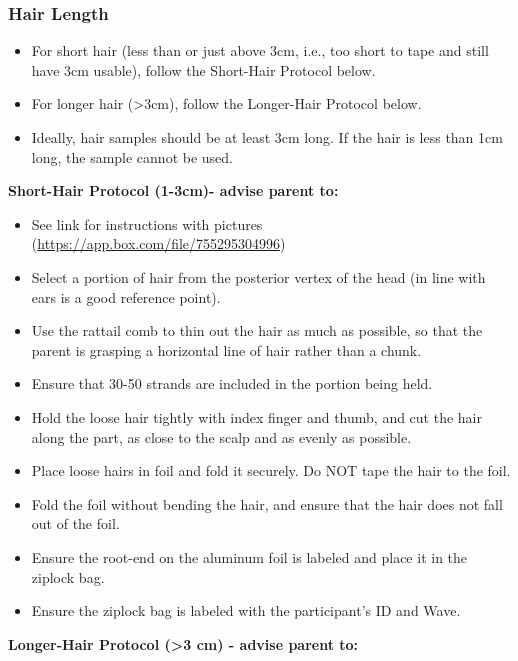 \documentclass[]{book}
\providecommand{\tightlist}{%
  \setlength{\itemsep}{0pt}\setlength{\parskip}{0pt}}
\begin{document}
\hypertarget{hair-length-1}{%
\subsubsection{Hair Length}\label{hair-length-1}}

\begin{itemize}
\tightlist
\item
  For short hair (less than or just above 3cm, i.e., too short to tape and still have 3cm usable), follow the Short-Hair Protocol below.
\item
  For longer hair (\textgreater{}3cm), follow the Longer-Hair Protocol below.
\item
  Ideally, hair samples should be at least 3cm long. If the hair is less than 1cm long, the sample cannot be used.
\end{itemize}

\textbf{Short-Hair Protocol (1-3cm)- advise parent to:}

\begin{itemize}
\tightlist
\item
  See link for instructions with pictures (\url{https://app.box.com/file/755295304996})
\item
  Select a portion of hair from the posterior vertex of the head (in line with ears is a good reference point).
\item
  Use the rattail comb to thin out the hair as much as possible, so that the parent is grasping a horizontal line of hair rather than a chunk.
\item
  Ensure that 30-50 strands are included in the portion being held.
\item
  Hold the loose hair tightly with index finger and thumb, and cut the hair along the part, as close to the scalp and as evenly as possible.
\item
  Place loose hairs in foil and fold it securely. Do NOT tape the hair to the foil.
\item
  Fold the foil without bending the hair, and ensure that the hair does not fall out of the foil.
\item
  Ensure the root-end on the aluminum foil is labeled and place it in the ziplock bag.
\item
  Ensure the ziplock bag is labeled with the participant's ID and Wave.
\end{itemize}

\textbf{Longer-Hair Protocol (\textgreater{}3 cm) - advise parent to:}
\end{document}
